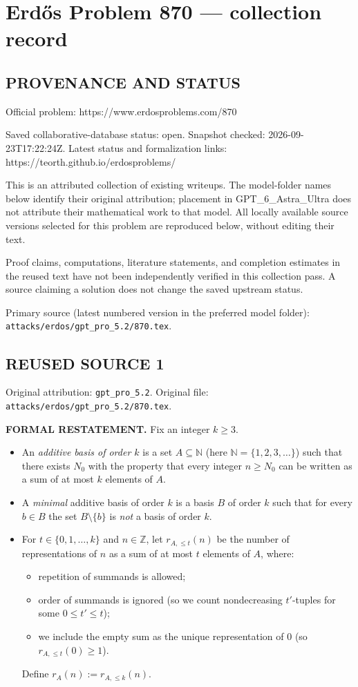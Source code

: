 \section*{Erd\H{o}s Problem 870 --- collection record}

\subsection*{PROVENANCE AND STATUS}
Official problem: https://www.erdosproblems.com/870

Saved collaborative-database status: open.
Snapshot checked: 2026-09-23T17:22:24Z.
Latest status and formalization links: https://teorth.github.io/erdosproblems/

This is an attributed collection of existing writeups. The model-folder names below identify their original attribution; placement in GPT\_6\_Astra\_Ultra does not attribute their mathematical work to that model. All locally available source versions selected for this problem are reproduced below, without editing their text.

Proof claims, computations, literature statements, and completion estimates in the reused text have not been independently verified in this collection pass. A source claiming a solution does not change the saved upstream status.

Primary source (latest numbered version in the preferred model folder): \texttt{attacks/erdos/gpt\_pro\_5.2/870.tex}.

\subsection*{REUSED SOURCE 1}
Original attribution: \texttt{gpt\_pro\_5.2}.
Original file: \texttt{attacks/erdos/gpt\_pro\_5.2/870.tex}.


\noindent\textbf{FORMAL RESTATEMENT.}
Fix an integer $k\ge 3$.

\begin{itemize}
\item An \emph{additive basis of order $k$} is a set $A\subseteq\mathbb N$ (here $\mathbb N=\{1,2,3,\dots\}$) such that there exists $N_0$ with the property that every integer $n\ge N_0$ can be written as a sum of at most $k$ elements of $A$.
\item A \emph{minimal} additive basis of order $k$ is a basis $B$ of order $k$ such that for every $b\in B$ the set $B\setminus\{b\}$ is \emph{not} a basis of order $k$.
\item For $t\in\{0,1,\dots,k\}$ and $n\in\mathbb Z$, let $r_{A,\le t}(n)$ be the number of representations of $n$ as a sum of at most $t$ elements of $A$, where:
  \begin{itemize}
  \item repetition of summands is allowed;
  \item order of summands is ignored (so we count nondecreasing $t'$-tuples for some $0\le t'\le t$);
  \item we include the empty sum as the unique representation of $0$ (so $r_{A,\le t}(0)\ge 1$).
  \end{itemize}
  Define $r_A(n):=r_{A,\le k}(n)$.
\end{itemize}

